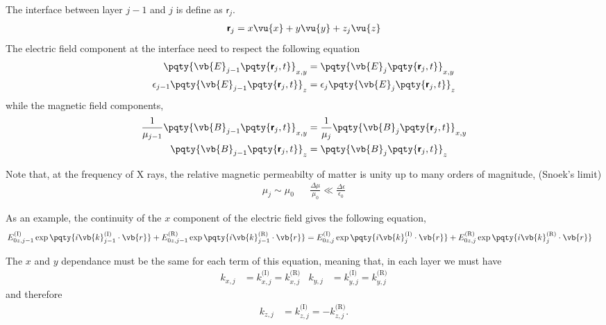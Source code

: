 The interface between layer $j-1$ and $j$ is define as $\boldsymbol{\mathsf{r}}_j$. 
\begin{align*}
	\boldsymbol{\mathsf{r}}_j = x\vu{x} + y\vu{y} + z_j\vu{z}
\end{align*}
The electric field component at the interface need to respect the following equation
\begin{align*}
	\pqty{\vb{E}_{j-1}\pqty{\boldsymbol{\mathsf{r}}_j,t}}_{x,y} &= \pqty{\vb{E}_{j}\pqty{\boldsymbol{\mathsf{r}}_j,t}}_{x,y} \\
	\epsilon_{j-1}\pqty{\vb{E}_{j-1}\pqty{\boldsymbol{\mathsf{r}}_j,t}}_z &= \epsilon_{j}\pqty{\vb{E}_{j}\pqty{\boldsymbol{\mathsf{r}}_j,t}}_z
\end{align*} while the magnetic field components,
\begin{align*}
	\frac{1}{\mu_{j-1}}\pqty{\vb{B}_{j-1}\pqty{\boldsymbol{\mathsf{r}}_j,t}}_{x,y} &= \frac{1}{\mu_j}\pqty{\vb{B}_{j}\pqty{\boldsymbol{\mathsf{r}}_j,t}}_{x,y} \\
	\pqty{\vb{B}_{j-1}\pqty{\boldsymbol{\mathsf{r}}_j,t}}_z &= \pqty{\vb{B}_{j}\pqty{\boldsymbol{\mathsf{r}}_j,t}}_z 
\end{align*}

Note that, at the frequency of X rays, the relative magnetic permeabilty of matter is unity up to many orders of magnitude, (Snoek's limit)
\begin{align*}
	\mu_j \sim \mu_0 && \frac{\Delta \mu}{\mu_0} \ll \frac{\Delta \epsilon}{\epsilon_0}
\end{align*} 

As an example, the continuity of the $x$ component of the electric field gives the following equation,
\begin{align*}
		E_{0z,{j-1}}^{(\text{I})}\exp\pqty{i\vb{k}_{j-1}^{(\text{I})}\cdot\vb{r}} + 
		E_{0z,{j-1}}^{(\text{R})}\exp\pqty{i\vb{k}_{j-1}^{(\text{R})}\cdot\vb{r}}
	&= 
		E_{0z,j}^{(\text{I})}\exp\pqty{i\vb{k}_j^{(\text{I})}\cdot\vb{r}} + 
		E_{0z,j}^{(\text{R})}\exp\pqty{i\vb{k}_j^{(\text{R})}\cdot\vb{r}}
\end{align*}


The $x$ and $y$ dependance must be the same for each term of this equation, meaning that, in each layer we must have
\begin{align*}
	k_{x,j} &= k^{\text{(I)}}_{x,j} = k^{\text{(R)}}_{x,j} & k_{y,j} &= k^{\text{(I)}}_{y,j} = k^{\text{(R)}}_{y,j}
\end{align*} and therefore
\begin{align*}
 	k_{z,j} &= k^{\text{(I)}}_{z,j} = -k^{\text{(R)}}_{z,j}.
\end{align*} 

